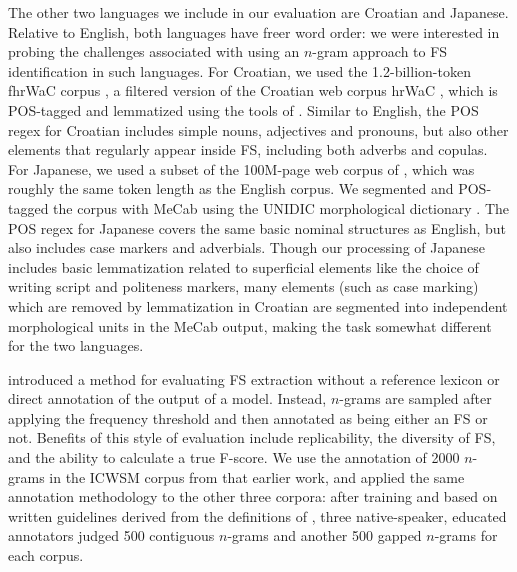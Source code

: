 \documentclass[11pt,letterpaper]{article}
\begin{document}
The other two languages we include in our evaluation are Croatian and Japanese. Relative to English, both languages have freer word order: we were interested in probing the challenges associated with using an $n$-gram approach to FS identification in such languages. For Croatian, we used the 1.2-billion-token fhrWaC corpus \cite{snajder2013building}, a filtered version of the Croatian web corpus hrWaC \cite{ljubesic2014bs}, which is POS-tagged and lemmatized using the tools of . Similar to English, the POS regex for Croatian includes simple nouns, adjectives and pronouns, but also other elements that regularly appear inside FS, including both adverbs and copulas. For Japanese, we used a subset of the 100M-page web corpus of , which was roughly the same token length as the English corpus. We segmented and POS-tagged the corpus with MeCab \cite{Kudo:2008} using the UNIDIC morphological dictionary \cite{Den:2007}. The POS regex for Japanese covers the same basic nominal structures as English, but also includes case markers and adverbials. Though our processing of Japanese includes basic lemmatization related to superficial elements like the choice of writing script and politeness markers, many elements (such as case marking) which are removed by lemmatization in Croatian are segmented into independent morphological units in the MeCab output, making the task somewhat different for the two languages.

 introduced a method for evaluating FS extraction without a reference lexicon or direct annotation of the output of a model. Instead, $n$-grams are sampled after applying the frequency threshold and then annotated as being either an FS or not. Benefits of this style of evaluation include replicability, the diversity of FS, and the ability to calculate a true F-score.  We use the annotation of 2000 $n$-grams in the ICWSM corpus from that earlier work, and applied the same annotation methodology to the other three corpora: after training and based on written guidelines derived from the definitions of , three native-speaker, educated annotators judged 500 contiguous $n$-grams and another 500 gapped $n$-grams for each corpus. 
\end{document}

